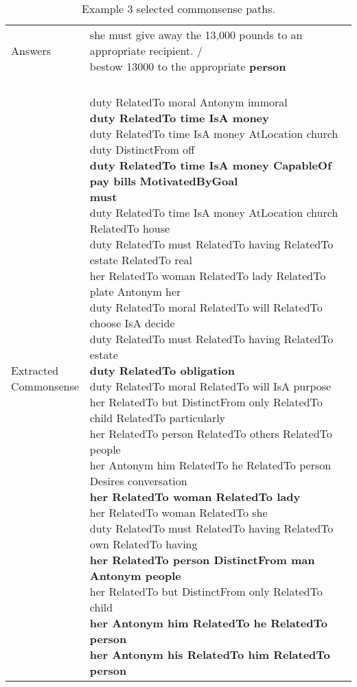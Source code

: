 \documentclass[11pt,a4paper]{article}
\begin{document}
\begin{table*}[!h]
\begin{small}
\begin{tabular}{|p{}|p{}|}
     Answers    & \makecell[l]{she must give away the 13,000 pounds to an appropriate recipient. /  \\ bestow 13000 to the appropriate \textbf{person}} \\
    \makecell[l]{Extracted \\ Commonsense} & \makecell[l]{\\
duty  RelatedTo  moral  Antonym  immoral\\
\textbf{duty  RelatedTo  time  IsA  money}\\
duty  RelatedTo  time  IsA  money  AtLocation  church\\
duty  DistinctFrom  off\\
\textbf{duty  RelatedTo  time  IsA  money  CapableOf  pay  bills} \textbf{ MotivatedByGoal} \\ \textbf{ must}\\
duty  RelatedTo  time  IsA  money  AtLocation  church  RelatedTo  house\\
duty  RelatedTo  must  RelatedTo  having  RelatedTo  estate  RelatedTo  real\\
her  RelatedTo  woman  RelatedTo  lady  RelatedTo  plate  Antonym  her\\
duty  RelatedTo  moral  RelatedTo  will  RelatedTo  choose  IsA  decide\\
duty  RelatedTo  must  RelatedTo  having  RelatedTo  estate\\
\textbf{duty  RelatedTo  obligation }\\
duty  RelatedTo  moral  RelatedTo  will  IsA  purpose\\
her  RelatedTo  but  DistinctFrom  only  RelatedTo  child  RelatedTo  particularly\\
her  RelatedTo  person  RelatedTo  others  RelatedTo  people\\
her  Antonym  him  RelatedTo  he  RelatedTo  person  Desires  conversation\\
\textbf{her  RelatedTo  woman  RelatedTo  lady}\\
her  RelatedTo  woman  RelatedTo  she\\
duty  RelatedTo  must  RelatedTo  having  RelatedTo  own  RelatedTo  having\\
\textbf{her  RelatedTo  person  DistinctFrom  man  Antonym  people}\\
her  RelatedTo  but  DistinctFrom  only  RelatedTo  child\\
\textbf{her  Antonym  him  RelatedTo  he  RelatedTo  person}\\
\textbf{her  Antonym  his  RelatedTo  him  RelatedTo  person}\\
    } \\
    \hline
  \end{tabular}
 \caption{Example 3 selected commonsense paths.}
 \label{tab:extractedex3}
 \end{small}
\end{table*}
\end{document}
